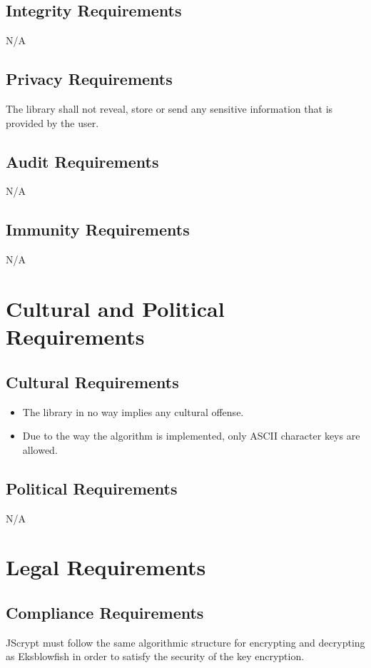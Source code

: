 \documentclass[12pt]{article}
\begin{document}
\subsection {Integrity Requirements}
N/A

\subsection {Privacy Requirements}
The library shall not reveal, store or send any sensitive information that is provided by the user. 

\subsection {Audit Requirements}
N/A

\subsection {Immunity Requirements}
N/A

\section {Cultural and Political Requirements}

\subsection {Cultural Requirements}
\begin{itemize}
	\item The library in no way implies any cultural offense.
	\item Due to the way the algorithm is implemented, only ASCII character keys are allowed.
	\end{itemize}

\subsection {Political Requirements}
N/A

\section {Legal Requirements}

\subsection {Compliance Requirements}
JScrypt must follow the same algorithmic structure for encrypting and decrypting as Eksblowfish in order to satisfy the security of the key encryption.
\end{document}
